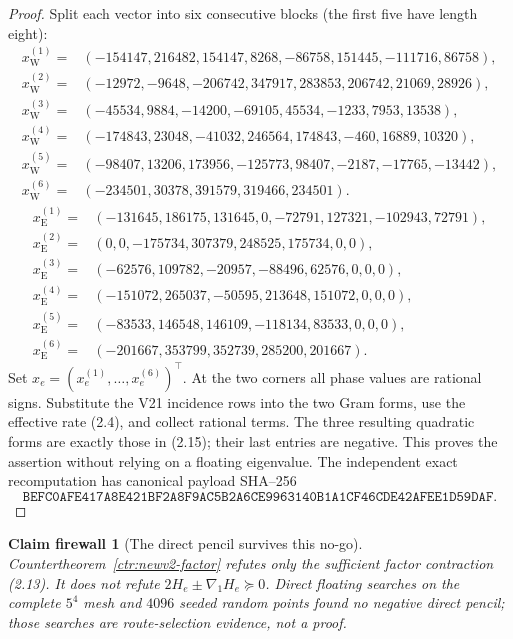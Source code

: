 \documentclass[11pt,oneside]{article}
\newtheorem{firewall}[theorem]{Claim firewall}
\theoremstyle{definition}
\theoremstyle{remark}
\begin{document}
\begin{proof}
Split each vector into six consecutive blocks (the first five have
length eight):
\[
\begin{aligned}
x_{\mathrm W}^{(1)}={}&(-154147,216482,154147,8268,-86758,
151445,-111716,86758),\\
x_{\mathrm W}^{(2)}={}&(-12972,-9648,-206742,347917,283853,
206742,21069,28926),\\
x_{\mathrm W}^{(3)}={}&(-45534,9884,-14200,-69105,45534,
-1233,7953,13538),\\
x_{\mathrm W}^{(4)}={}&(-174843,23048,-41032,246564,174843,
-460,16889,10320),\\
x_{\mathrm W}^{(5)}={}&(-98407,13206,173956,-125773,98407,
-2187,-17765,-13442),\\
x_{\mathrm W}^{(6)}={}&(-234501,30378,391579,319466,234501).
\end{aligned}                                               \tag{2.17}
\]
\[
\begin{aligned}
x_{\mathrm E}^{(1)}={}&(-131645,186175,131645,0,-72791,
127321,-102943,72791),\\
x_{\mathrm E}^{(2)}={}&(0,0,-175734,307379,248525,175734,0,0),\\
x_{\mathrm E}^{(3)}={}&(-62576,109782,-20957,-88496,62576,0,0,0),\\
x_{\mathrm E}^{(4)}={}&(-151072,265037,-50595,213648,151072,0,0,0),\\
x_{\mathrm E}^{(5)}={}&(-83533,146548,146109,-118134,83533,0,0,0),\\
x_{\mathrm E}^{(6)}={}&(-201667,353799,352739,285200,201667).
\end{aligned}
\tag{2.18}
\]
Set \(x_e=(x_e^{(1)},\ldots,x_e^{(6)})^\top\).
At the two corners all phase values are rational signs.  Substitute
the V21 incidence rows into the two Gram forms, use the effective
rate (2.4), and collect rational terms.  The three resulting
quadratic forms are exactly those in (2.15); their last entries are
negative.  This proves the assertion without relying on a floating
eigenvalue.  The independent exact recomputation has canonical
payload SHA--256
\[
\texttt{BEFC0AFE417A8E421BF2A8F9AC5B2A6CE9963140B1A1CF46CDE42AFEE1D59DAF}.
                                                               \tag{2.19}
\]
\end{proof}

\begin{firewall}[The direct pencil survives this no-go]
\label{fire:newv2-factor}
Countertheorem~\ref{ctr:newv2-factor} refutes only the sufficient
factor contraction (2.13).  It does not refute
\(2H_e\pm\nabla_1H_e\succeq0\).  Direct floating searches on the
complete \(5^4\) mesh and \(4096\) seeded random points found no
negative direct pencil; those searches are route-selection evidence,
not a proof.
\end{firewall}
\end{document}
